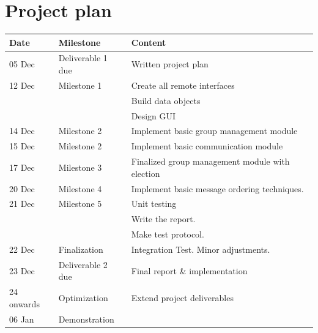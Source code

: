 \documentclass[a4paper,english,twoside]{article}
\begin{document}
\section{Project plan} 
\label{app:projectplan}
\begin{tabular}{|l|l|p{7.5cm}|}
\hline
Date	&	Milestone	&	Content \\
\hline
05 Dec	&	Deliverable 1 due	&	Written project plan \\
12 Dec &	Milestone 1 &	Create all remote interfaces \\ 
						&&	Build data objects \\
						&&	Design GUI \\
14 Dec &	Milestone 2 & 	Implement basic group management module \\
15 Dec &	Milestone 2 & 	Implement basic communication module \\
17 Dec	&	Milestone 3 & 	Finalized group management module with election \\
20 Dec	&	Milestone 4 & 	Implement basic message ordering techniques. \\
21 Dec	&	Milestone 5 & 	Unit testing  \\ && Write the report.\\ && Make test protocol. \\
22 Dec	&	Finalization 	& Integration Test. Minor adjustments. \\
23 Dec	&	Deliverable 2 due 	& Final report \& implementation \\
24 onwards	&	Optimization 	& Extend project deliverables\\
06 Jan & Demonstration	& \\
\hline
\end{tabular}
\end{document}
